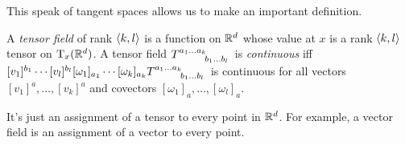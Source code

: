 This speak of tangent spaces allows us to make an important definition.
\begin{dfn}\label{TensorField}
A \emph{tensor field} of rank $\langle k,l\rangle$ is a function on $\mathbb{R} ^d$ whose value at $x$ is a rank $\langle k,l\rangle$ tensor on $\tangent[\R ^d][x]$.  A tensor field $T\indices{^{a_1\ldots a_k}_{b_1\ldots b_l}}$ is \emph{continuous} iff $[v_1]^{b_1}\cdots [v_l]^{b_l}[\omega _1]_{a_1}\cdots [\omega _k]_{a_k}T\indices{^{a_1\ldots a_k}_{b_1\ldots b_l}}$ is continuous for all vectors $[v_1]^a,\ldots ,[v_k]^a$ and covectors $[\omega _1]_a,\ldots ,[\omega _l]_a$.
\begin{rmk}
It's just an assignment of a tensor to every point in $\mathbb{R} ^d$.  For example, a vector field is an assignment of a vector to every point.
\end{rmk}
\end{dfn}

